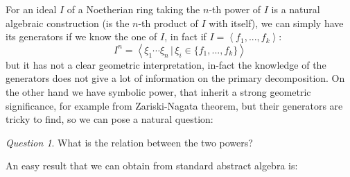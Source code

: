 \documentclass[a4wide]{book}
\theoremstyle{plain}
\theoremstyle{remark}
\newtheorem{que}[rem]{Question}
\theoremstyle{definition}
\newcounter{que}
\begin{document}
For an ideal $ I $ of a Noetherian ring taking the $ n $-th power of $ I $ is a natural algebraic construction (is the $ n $-th product of $ I $ with itself), we can simply have its generators if we know the one of $ I $, in fact if $ I = \left\langle f_1 , ... ,f_k \right\rangle $:
\[ I^n = \left\langle \xi_1 \cdots \xi_n \,|\, \xi_i \in \{ f_1 , ... ,f_k \} \right\rangle \]
but it has not a clear geometric interpretation, in-fact the knowledge of the generators does not give a lot of information on the primary decomposition. On the other hand we have symbolic power, that inherit a strong geometric significance, for example from Zariski-Nagata theorem, but their generators are tricky to find, so we can pose a natural question:

\begin{que}
What is the relation between the two powers?
\end{que}

An easy result that we can obtain from standard abstract algebra is:
\end{document}

